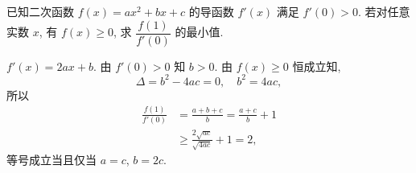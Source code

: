 \begin{exercise}
    已知二次函数 $f(x)=ax^2 +bx+c$ 的导函数 $f'(x)$ 满足 $f'(0)>0$. 若对任意实数 $x$, 有 $f(x)\geqslant 0$, 求 $\dfrac{f(1)}{f'(0)}$ 的最小值.
\end{exercise}
\beginsolution
    $f'(x)= 2ax+b$. 由 $f'(0)>0$ 知 $b>0$. 由 $f(x)\geqslant 0$ 恒成立知,
    \[\Delta= b^2-4ac= 0,\quad b^2= 4ac,\]
    所以
    \[\begin{aligned}
        \frac{f(1)}{f'(0)}
        &= \frac{a+b+c}{b}= \frac{a+c}{b}+ 1\\
        &\geqslant \frac{2\sqrt{ac}}{\sqrt{4ac}}+ 1= 2,
    \end{aligned}\]
    等号成立当且仅当 $a=c$, $b=2c$.
\endsolution
